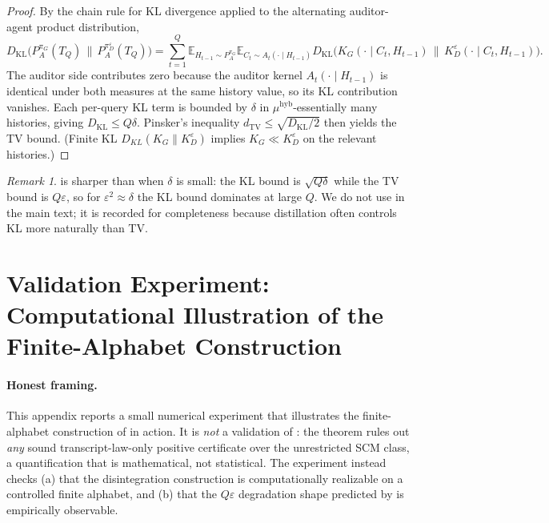 \documentclass{article}
\theoremstyle{plain}
\theoremstyle{definition}
\theoremstyle{remark}
\newtheorem{remark}[theorem]{Remark}
\newcommand{\TV}{\mathrm{TV}}
\newcommand{\KL}{\mathrm{KL}}
\newcommand{\dtv}{d_{\TV}}
\newcommand{\dkl}{D_{\KL}}
\newcommand{\PpiA}[1]{P_A^{\pi_{#1}}}
\begin{document}
\begin{proof}
By the chain rule for KL divergence applied to the alternating auditor-agent
product distribution,
\[
\dkl\big(\PpiA{G}(T_Q) \,\|\, P_A^{\pi_D^\varepsilon}(T_Q)\big)
= \sum_{t=1}^Q \mathbb{E}_{H_{t-1} \sim P_A^{\pi_G}}
  \mathbb{E}_{C_t \sim A_t(\cdot \mid H_{t-1})}\!
  \dkl\!\big(K_G(\cdot \mid C_t, H_{t-1}) \,\|\, K_D^\varepsilon(\cdot \mid C_t, H_{t-1})\big).
\]
The auditor side contributes zero because the auditor kernel
$A_t(\cdot \mid H_{t-1})$ is identical under both measures at the same
history value, so its KL contribution vanishes. Each per-query KL term is
bounded by $\delta$ in $\mu^{\mathrm{hyb}}$-essentially many histories,
giving $\dkl \le Q\delta$. Pinsker's inequality
$\dtv \le \sqrt{\dkl / 2}$ then yields the TV bound. (Finite KL
$D_{KL}(K_G \| K_D^\varepsilon)$ implies $K_G \ll K_D^\varepsilon$ on the
relevant histories.)
\end{proof}

\begin{remark}
 is sharper than  when $\delta$ is small: the
KL bound is $\sqrt{Q\delta}$ while the TV bound is $Q\varepsilon$, so for
$\varepsilon^2 \approx \delta$ the KL bound dominates at large $Q$. We do not
use  in the main text; it is recorded for completeness because
distillation often controls KL more naturally than TV.
\end{remark}

\section{Validation Experiment: Computational Illustration of the Finite-Alphabet Construction}\label{app:validation}

\paragraph{Honest framing.}
This appendix reports a small numerical experiment that illustrates the
finite-alphabet construction of  in action. It is
\emph{not} a validation of : the theorem rules out
\emph{any} sound transcript-law-only positive certificate over the unrestricted
SCM class, a quantification that is mathematical, not statistical. The
experiment instead checks (a) that the disintegration construction is
computationally realizable on a controlled finite alphabet, and (b) that the
$Q\varepsilon$ degradation shape predicted by  is empirically
observable.
\end{document}
